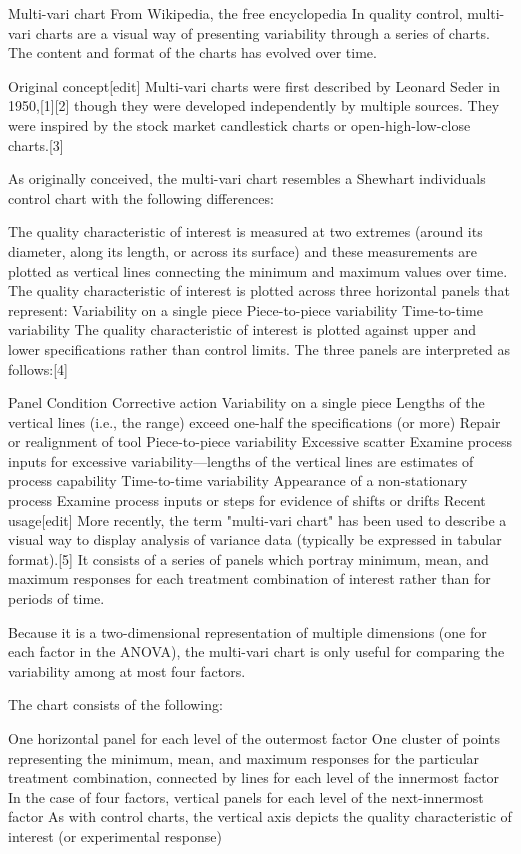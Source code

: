 Multi-vari chart
From Wikipedia, the free encyclopedia
In quality control, multi-vari charts are a visual way of presenting variability through a series of charts. The content and format of the charts has evolved over time.

Original concept[edit]
Multi-vari charts were first described by Leonard Seder in 1950,[1][2] though they were developed independently by multiple sources. They were inspired by the stock market candlestick charts or open-high-low-close charts.[3]

As originally conceived, the multi-vari chart resembles a Shewhart individuals control chart with the following differences:

The quality characteristic of interest is measured at two extremes (around its diameter, along its length, or across its surface) and these measurements are plotted as vertical lines connecting the minimum and maximum values over time.
The quality characteristic of interest is plotted across three horizontal panels that represent:
Variability on a single piece
Piece-to-piece variability
Time-to-time variability
The quality characteristic of interest is plotted against upper and lower specifications rather than control limits.
The three panels are interpreted as follows:[4]

Panel	Condition	Corrective action
Variability on a single piece	Lengths of the vertical lines (i.e., the range) exceed one-half the specifications (or more)	Repair or realignment of tool
Piece-to-piece variability	Excessive scatter	Examine process inputs for excessive variability—lengths of the vertical lines are estimates of process capability
Time-to-time variability	Appearance of a non-stationary process	Examine process inputs or steps for evidence of shifts or drifts
Recent usage[edit]
More recently, the term "multi-vari chart" has been used to describe a visual way to display analysis of variance data (typically be expressed in tabular format).[5] It consists of a series of panels which portray minimum, mean, and maximum responses for each treatment combination of interest rather than for periods of time.

Because it is a two-dimensional representation of multiple dimensions (one for each factor in the ANOVA), the multi-vari chart is only useful for comparing the variability among at most four factors.

The chart consists of the following:

One horizontal panel for each level of the outermost factor
One cluster of points representing the minimum, mean, and maximum responses for the particular treatment combination, connected by lines for each level of the innermost factor
In the case of four factors, vertical panels for each level of the next-innermost factor
As with control charts, the vertical axis depicts the quality characteristic of interest (or experimental response)
